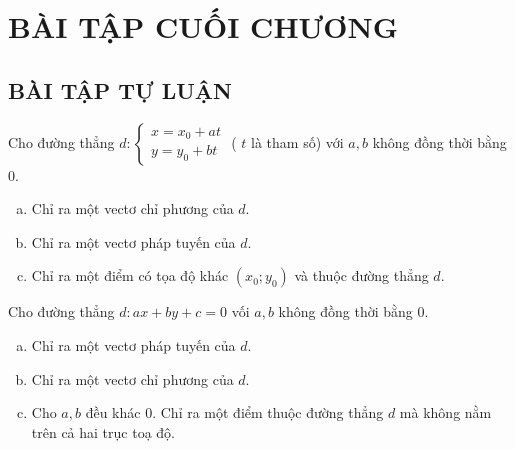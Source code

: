 \newpage\setcounter{dang}{0}
\section*{BÀI TẬP CUỐI CHƯƠNG}
\subsection{BÀI TẬP TỰ LUẬN}
\setcounter{bt}{0}
\begin{bt}%
	Cho đường thẳng $d:\left\{\begin{array}{l}x=x_{0}+a t \\ y=y_{0}+b t\end{array}\right.$ ( $t$ là tham số) với $a, b$ không đồng thời bằng $0$.
	\begin{enumerate}[a)]
	\item Chỉ ra một vectơ chỉ phương của $d$.
	\item Chỉ ra một vectơ pháp tuyến của $d$.
	\item Chỉ ra một điểm có tọa độ khác $\left(x_{0} ; y_{0}\right)$ và thuộc đường thẳng $d$.
	\end{enumerate}
\end{bt}
\begin{bt}%
	Cho đường thẳng $d: a x+b y+c=0$ vối $a, b$ không đồng thời bằng $0$.
	\begin{enumerate}[a)]
	\item Chỉ ra một vectơ pháp tuyến của $d$.
	\item Chỉ ra một vectơ chỉ phương của $d$.
	\item Cho $a, b$ đều khác $0$. Chỉ ra một điểm thuộc đường thẳng $d$ mà không nằm trên cả hai trục toạ độ.
	\end{enumerate}
\end{bt}

